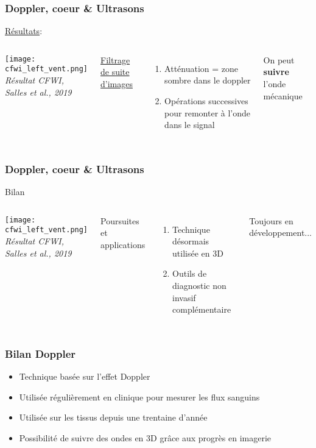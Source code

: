 \documentclass{beamer}
\begin{document}
\begin{frame}
\frametitle{Doppler, coeur \& Ultrasons}
\underline{Résultats}:
\begin{columns}
\column{60mm}
\begin{center}
\texttt{[image: cfwi\_left\_vent.png]}\\
\textit{\footnotesize Résultat CFWI, Salles \textit{et al.}, 2019}
\end{center}
\column{60mm}
\underline{Filtrage de suite d'images}\\
\vspace{0.5cm}
\begin{enumerate}
\item Atténuation = zone sombre dans le doppler
\vspace{0.5cm}
\item Opérations successives pour remonter à l'onde dans le signal 
\vspace{0.5cm}
\end{enumerate}
On peut \textbf{suivre} l'onde mécanique 
\end{columns}
\end{frame}

\begin{frame}
\frametitle{Doppler, coeur \& Ultrasons}
Bilan
\begin{columns}
\column{60mm}
\begin{center}
\texttt{[image: cfwi\_left\_vent.png]}\\
\textit{\footnotesize Résultat CFWI, Salles \textit{et al.}, 2019}
\end{center}
\column{60mm}
Poursuites et applications\\
\vspace{0.5cm}
\begin{enumerate}
\item Technique désormais utilisée en 3D
\vspace{0.5cm}
\item Outils de diagnostic non invasif complémentaire  
\vspace{0.5cm}
\end{enumerate}
Toujours en développement... 
\end{columns}
\end{frame}

\begin{frame}
\frametitle{Bilan Doppler}
 
\begin{itemize}
\item Technique basée sur l'effet Doppler 
\vspace{0.5cm}
\item Utilisée régulièrement en clinique pour mesurer les flux sanguins
\vspace{0.5cm}
\item Utilisée sur les tissus depuis une trentaine d'année
\vspace{0.5cm}
\item Possibilité de suivre des ondes en 3D grâce aux progrès en imagerie
\vspace{0.5cm}
\end{itemize}
\end{frame}
\end{document}
